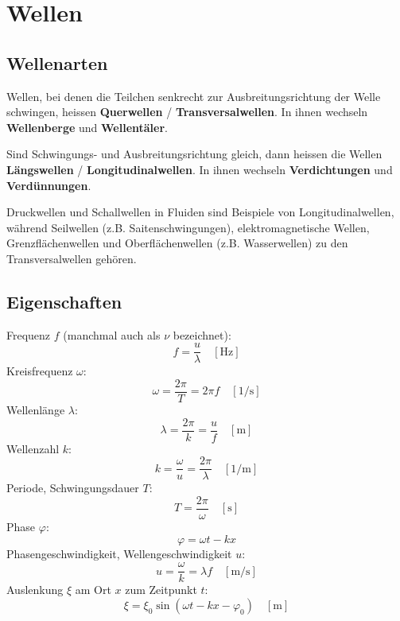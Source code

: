 \section{Wellen}

\subsection{Wellenarten}

Wellen, bei denen die Teilchen senkrecht zur Ausbreitungsrichtung der Welle
schwingen, heissen \textbf{Querwellen} / \textbf{Transversalwellen}. In ihnen
wechseln \textbf{Wellenberge} und \textbf{Wellentäler}.


Sind Schwingungs- und Ausbreitungsrichtung gleich, dann heissen die Wellen
\textbf{Längswellen} / \textbf{Longitudinalwellen}. In ihnen wechseln
\textbf{Verdichtungen} und \textbf{Verdünnungen}.


Druckwellen und Schallwellen in Fluiden sind Beispiele von Longitudinalwellen, während Seilwellen (z.B. Saitenschwingungen), elektromagnetische Wellen, Grenzflächenwellen und Oberflächenwellen (z.B. Wasserwellen) zu den Transversalwellen gehören.

\subsection{Eigenschaften}



Frequenz $f$ (manchmal auch als $\nu$ bezeichnet):
\[
	f = \frac{u}{\lambda}
	\quad \left[ \textrm{Hz} \right]
\]
Kreisfrequenz $\omega$:
\[
	\omega = \frac{2 \pi}{T} = 2 \pi f
	\quad \left[ 1/\textrm{s} \right]
\]
Wellenlänge $\lambda$:
\[
	\lambda = \frac{2 \pi}{k} = \frac{u}{f}
	\quad \left[ \textrm{m} \right]
\]
Wellenzahl $k$:
\[
	k = \frac{\omega}{u} = \frac{2 \pi}{\lambda}
	\quad \left[ 1/\textrm{m} \right]
\]
Periode, Schwingungsdauer $T$:
\[
	T = \frac{2 \pi}{\omega}
	\quad \left[ \textrm{s} \right]
\]
Phase $\varphi$:
\[
	\varphi = \omega t - k x
\]
Phasengeschwindigkeit, Wellengeschwindigkeit $u$:
\[
	u = \frac{\omega}{k} = \lambda f
	\quad \left[ \textrm{m} / \textrm{s} \right]
\]
Auslenkung $\xi$ am Ort $x$ zum Zeitpunkt $t$:
\[
	\xi = \xi_0 \sin (\omega t - k x - \varphi_0)
	\quad \left[ \textrm{m} \right]
\]

